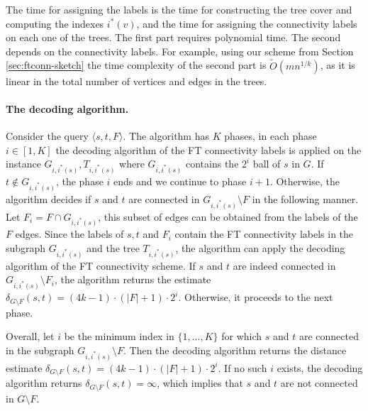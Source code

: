 The time for assigning the labels is the time for constructing the tree cover and computing the indexes $i^{*}(v)$, and the time for assigning the connectivity labels on each one of the trees. The first part requires polynomial time. The second depends on the connectivity labels. For example, using our scheme from Section \ref{sec:ftconn-sketch} the time complexity of the second part is $\widetilde{O}(mn^{1/k})$, as it is linear in the total number of vertices and edges in the trees. %



\paragraph{The decoding algorithm.}
Consider the query $\langle s,t,F\rangle$. 
The algorithm has $K$ phases, in each phase $i \in [1,K]$ the decoding algorithm of the FT connectivity labels is applied on the instance $G_{i,i^*(s)}, T_{i,i^*(s)}$ where $G_{i,i^*(s)}$ contains the $2^i$ ball of $s$ in $G$. 
If $t \notin G_{i,i^*(s)}$, the phase $i$ ends and we continue to phase $i+1$. 
Otherwise, the algorithm decides if $s$ and $t$ are connected in $G_{i,i^*(s)} \setminus F$ in the following manner. 
Let $F_i=F \cap G_{i,i^*(s)}$, this subset of edges can be obtained from the labels of the $F$ edges. 
Since the labels of $s,t$ and $F_i$ contain the FT connectivity labels in the subgraph $G_{i,i^*(s)}$ and the tree $T_{i,i^*(s)}$, the algorithm can apply the decoding algorithm of the FT connectivity scheme.
If $s$ and $t$ are indeed connected in $G_{i,i^*(s)}\setminus F_i$, the algorithm returns the estimate $\delta_{G \setminus F}(s,t)= (4k-1) \cdot (|F|+1) \cdot 2^{i}$. Otherwise, it proceeds to the next phase.

Overall, let $i$ be the minimum index in $\{1,\ldots, K\}$ for which $s$ and $t$ are connected in the subgraph $G_{i,i^*(s)} \setminus F$. Then the decoding algorithm returns the distance estimate $\delta_{G \setminus F}(s,t)=(4k-1) \cdot (|F|+1) \cdot 2^{i}$. If no such $i$ exists, the decoding algorithm returns $\delta_{G \setminus F}(s,t)=\infty$, which implies that $s$ and $t$ are not connected in $G \setminus F$. 

